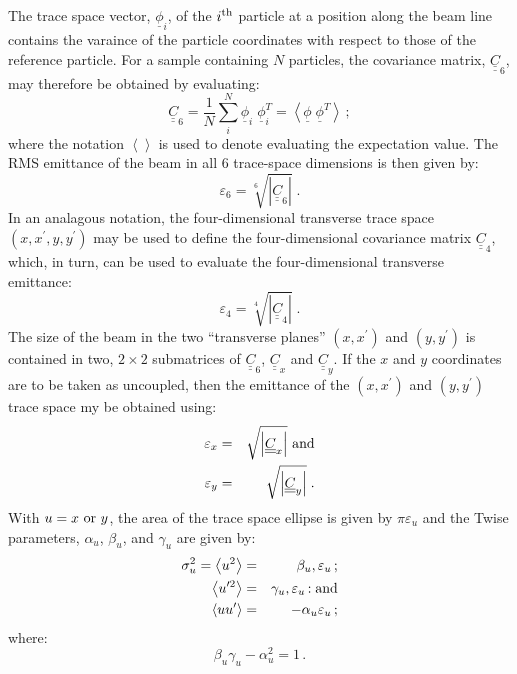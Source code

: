 The trace space vector, $\underline{\phi}_i$, of the $i^{\rm th}$
particle at a position along the beam line contains the varaince of
the particle coordinates with respect to those of the reference
particle.
For a sample containing $N$ particles, the covariance matrix,
$\underline{\underline{C}}_6$, may therefore be obtained by evaluating:
\begin{equation}
  \underline{\underline{C}}_6 = \frac{1}{N} \sum_i^N
                                    \underline{\phi}_i \; \underline{\phi}_i^T
                              = \left<
                                    \underline{\phi} \; \underline{\phi}^T
                                \right> \, ;
\end{equation}
where the notation $\left< \right>$ is used to denote evaluating the
expectation value.
The RMS emittance of the beam in all 6 trace-space dimensions is then
given by:
\begin{equation}
  \varepsilon_6 = \sqrt[6]{\left| \underline{\underline{C}}_6 \right| }\;.
\end{equation}
In an analagous notation, the four-dimensional transverse trace space
$(x, x^\prime, y, y^\prime)$ may be used to define the
four-dimensional covariance matrix $\underline{\underline{C}}_4$,
which, in turn, can be used to evaluate the four-dimensional
transverse emittance:
\begin{equation}
  \varepsilon_4 = \sqrt[4]{\left| \underline{\underline{C}}_4 \right| }\;.
\end{equation}
The size of the beam in the two ``transverse planes'' $(x, x^\prime)$
and $(y, y^\prime)$ is contained in two, $2 \times 2$ submatrices of
$\underline{\underline{C}}_6$, $\underline{\underline{C}}_x$ and
$\underline{\underline{C}}_y$.
If the $x$ and $y$ coordinates are to be taken as uncoupled, then the
emittance of the $(x, x^\prime)$ and $(y, y^\prime)$ trace space my
be obtained using:
\begin{eqnarray}
  \varepsilon_x & = & \sqrt     {\left| \underline{\underline{C}}_x \right| }
    {\rm~and} \\
  \varepsilon_y & = & \sqrt{\left| \underline{\underline{C}}_y \right| }\;.
\end{eqnarray}
With $u=x~{\rm or}~y$, the area of the trace space ellipse is given
by $\pi \varepsilon_u$ and the Twise parameters, $\alpha_u$,
$\beta_u$, and $\gamma_u$ are given by:
\begin{eqnarray}
  \sigma_u^2 = \left< u^2 \right> &         = & \beta_u, \varepsilon_u \, ;            \\
  \left< u^{\prime 2} \right> &              = & \gamma_u, \varepsilon_u \, {\rm : and} \\
  \left< u u^\prime \right>   &              = & -\alpha_u \varepsilon_u \, ;
\end{eqnarray}
where:
\begin{equation}
  \beta_u \gamma_u - \alpha_u^2 = 1 \, .
\end{equation}

